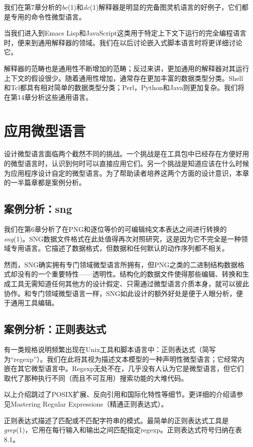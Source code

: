 \documentclass[12pt,oneside]{book}
\begin{document}
\begin{common-format}
我们在第7章分析的\textit{bc}(1)和\textit{dc}(1)解释器是明显的完备图灵机语言的好例子，它们都是专用的命令性微型语言。

当我们进入到Emacs Lisp和JavaScript这类用于特定上下文下运行的完全编程语言时，便来到通用解释器的领域。我们在以后讨论嵌入式脚本语言时将更详细讨论它。

解释器的范畴也是通用性不断增加的范畴；反过来讲，更加通用的解释器对其运行上下文的假设很少。随着通用性增加，通常存在更加丰富的数据类型分类。Shell和Tcl都具有相对简单的数据类型分类；Perl，Python和Java则更加复杂。我们将在第14章分析这些通用语言。


\section{应用微型语言}
设计微型语言面临两个截然不同的挑战。一个挑战是在工具包中已经存在方便好用的微型语言时，认识到何时可以直接应用它们。另一个挑战是知道应该在什么时候为应用程序设计自定的微型语言。为了帮助读者培养这两个方面的设计意识，本章的一半篇章都是案例分析。

\subsection{案例分析：sng}
我们在第6章分析了在PNG和逐位等价的可编辑纯文本表达之间进行转换的\textit{sng}(1)。SNG数据文件格式在此处值得再次对照研究，这是因为它不完全是一种领域专用语言。它描述了数据格式，但数据和任何默认的动作序列都不相关。

然而，SNG确实拥有专门领域微型语言所拥有，但PNG之类的二进制结构数据格式却没有的一个重要特性——透明性。结构化的数据文件使得那些编辑、转换和生成工具无需知道任何其他方的设计假定、只需通过微型语言介质本身，就可以彼此协作。和专门领域微型语言一样，SNG如此设计的额外好处是便于人眼分析，便于通用工具编辑。

\subsection{案例分析：正则表达式}
有一类规格说明频繁出现在Unix工具和脚本语言中：正则表达式（简写为“regexp”）。我们在此将其视为描述文本模型的一种声明性微型语言；它经常内嵌在其它微型语言中。Regexp无处不在，几乎没有人认为它是微型语言，但它们取代了那种执行不同（而且不可互用）搜索功能的大堆代码。

以上介绍跳过了POSIX扩展、反向引用和国际化特性等细节。更详细的介绍请参见Mastering  Regular Expressions（精通正则表达式）\cite{Friedl}。

正则表达式描述了匹配或不匹配字符串的模式。最简单的正则表达式工具是\textit{grep}(1)，它用在每行输入和输出之间匹配指定regexp。正则表达式符号归纳在表8.1。


\end{common-format}
\end{document}
